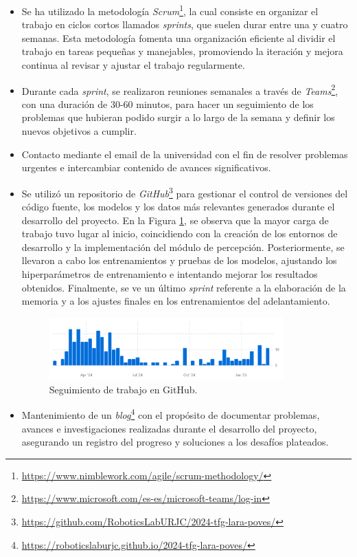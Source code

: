 \begin{itemize}
\item Se ha utilizado la metodología \textit{Scrum}\footnote{\url{https://www.nimblework.com/agile/scrum-methodology/}}, la cual consiste en organizar el trabajo en ciclos cortos llamados \textit{sprints}, que suelen durar entre una y cuatro semanas. Esta metodología fomenta una organización eficiente al dividir el trabajo en tareas pequeñas y manejables, promoviendo la iteración y mejora continua al revisar y ajustar el trabajo regularmente.
\item Durante cada \textit{sprint}, se realizaron reuniones semanales a través de \textit{Teams}\footnote{\url{https://www.microsoft.com/es-es/microsoft-teams/log-in}}, con una duración de 30-60 minutos, para hacer un seguimiento de los problemas que hubieran podido surgir a lo largo de la semana y definir los nuevos objetivos a cumplir.
\item Contacto mediante el email de la universidad con el fin de resolver problemas urgentes e intercambiar contenido de avances significativos.
\item Se utilizó un repositorio de \textit{GitHub}\footnote{\url{https://github.com/RoboticsLabURJC/2024-tfg-lara-poves/}} para gestionar el control de versiones del código fuente, los modelos y los datos más relevantes generados durante el desarrollo del proyecto. En la Figura \ref{fig:github}, se observa que la mayor carga de trabajo tuvo lugar al inicio, coincidiendo con la creación de los entornos de desarrollo y la implementación del módulo de percepción. Posteriormente, se llevaron a cabo los entrenamientos y pruebas de los modelos, ajustando los hiperparámetros de entrenamiento e intentando mejorar los resultados obtenidos. Finalmente, se ve un último \textit{sprint} referente a la elaboración de la memoria y a los ajustes finales en los entrenamientos del adelantamiento.

\begin{figure}[ht]
\centering
\includegraphics[width=9cm]{figs/objetivos/github.png}
\caption{Seguimiento de trabajo en GitHub.}
\label{fig:github}
\end{figure}

\item Mantenimiento de un \textit{blog}\footnote{\url{https://roboticslaburjc.github.io/2024-tfg-lara-poves/}} con el propósito de documentar problemas, avances e investigaciones realizadas durante el desarrollo del proyecto, asegurando un registro del progreso y soluciones a los desafíos plateados.

\end{itemize}

